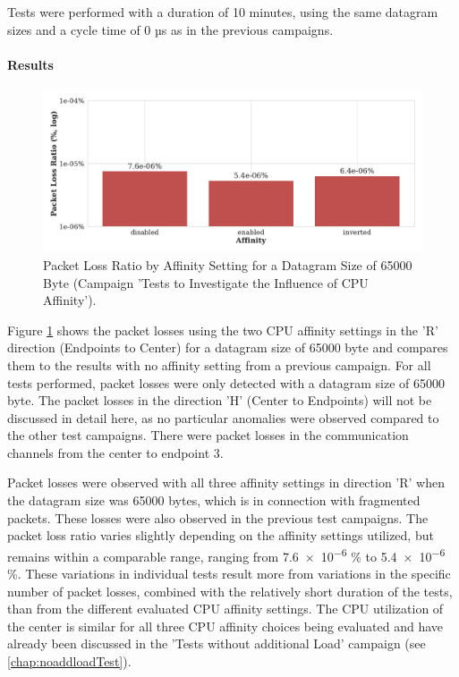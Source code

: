 Tests were performed with a duration of 10 minutes, using the same datagram sizes and a cycle time of 0 µs as in the previous campaigns.

\paragraph{Results}

\begin{figure}[h]
    \centering
    \includegraphics[width=1\linewidth]{figures/reliability/ihawk/diagr9.pdf}
    \caption{Packet Loss Ratio by Affinity Setting for a Datagram Size of 65000 Byte (Campaign 'Tests to Investigate the Influence of CPU Affinity').}
    \label{fig:diagr9Loss}
\end{figure}

Figure \ref{fig:diagr9Loss} shows the packet losses using the two CPU affinity settings in the 'R' direction (Endpoints to Center) for a datagram size of 65000 byte and compares them to the results with no affinity setting from a previous campaign. For all tests performed, packet losses were only detected with a datagram size of 65000 byte. The packet losses in the direction 'H' (Center to Endpoints) will not be discussed in detail here, as no particular anomalies were observed compared to the other test campaigns. There were packet losses in the communication channels from the center to endpoint 3.

Packet losses were observed with all three affinity settings in direction 'R' when the datagram size was 65000 bytes, which is in connection with fragmented packets. These losses were also observed in the previous test campaigns.  The packet loss ratio varies slightly depending on the affinity settings utilized, but remains within a comparable range, ranging from \num{7.6e-6} \%  to \num{5.4e-6} \%. These variations in individual tests result more from variations in the specific number of packet losses, combined with the relatively short duration of the tests, than from the different evaluated CPU affinity settings. The CPU utilization of the center is similar for all three CPU affinity choices being evaluated and have already been discussed in the 'Tests without additional Load' campaign (see \ref{chap:noaddloadTest}).

